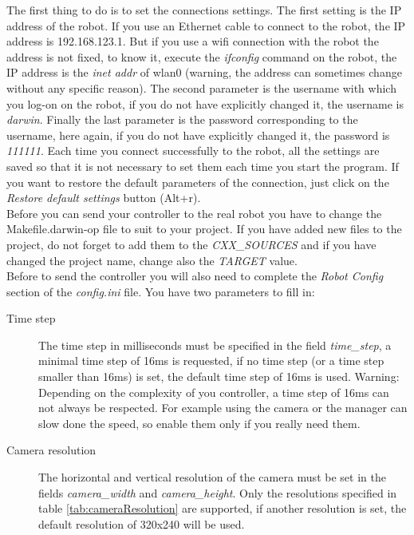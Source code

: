 \documentclass[a4paper, 12pt]{article}  		%
\begin{document}
The first thing to do is to set the connections settings. The first setting is the IP address of the robot. If you use an Ethernet cable to connect to the robot, the IP address is 192.168.123.1. But if you use a wifi connection with the robot the address is not fixed, to know it, execute the \textit{ifconfig} command on the robot, the IP address is the \textit{inet addr} of wlan0 (warning, the address can sometimes change without any specific reason). The second parameter is the username with which you log-on on the robot, if you do not have explicitly changed it, the username is \textit{darwin}. Finally the last parameter is the password corresponding to the username, here again, if you do not have explicitly changed it, the password is \textit{111111}. Each time you connect successfully to the robot, all the settings are saved so that it is not necessary to set them each time you start the program. If you want to restore the default parameters of the connection, just click on the \textit{Restore default settings} button (Alt+r).\\

Before you can send your controller to the real robot you have to change the Makefile.darwin-op file to suit to your project. If you have added new files to the project, do not forget to add them to the \textit{CXX\_SOURCES} and if you have changed the project name, change also the \textit{TARGET} value.\\

\newpage
Before to send the controller you will also need to complete the \textit{Robot Config} section of the \textit{config.ini} file. You have two parameters to fill in:
\begin{description}
\item[Time step] The time step in milliseconds must be specified in the field \textit{time\_step}, a minimal time step of 16ms is requested, if no time step (or a time step smaller than 16ms) is set, the default time step of 16ms is used. Warning: Depending on the complexity of you controller, a time step of 16ms can not always be respected. For example using the camera or the manager can slow done the speed, so enable them only if you really need them.\\
\item[Camera resolution] The horizontal and vertical resolution of the camera must be set in the fields \textit{camera\_width} and \textit{camera\_height}. Only the resolutions specified in table \ref{tab:cameraResolution} are supported, if another resolution is set, the default resolution of 320x240 will be used.\\
\end{description}
\end{document}
